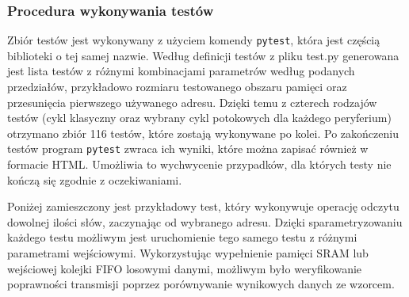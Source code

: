 \subsubsection{Procedura wykonywania testów}
Zbiór testów jest wykonywany z użyciem komendy \texttt{pytest}, która jest częścią biblioteki o tej samej nazwie. Według definicji testów z pliku test.py generowana jest lista testów z różnymi kombinacjami parametrów według podanych przedziałów, przykładowo rozmiaru testowanego obszaru pamięci oraz przesunięcia pierwszego używanego adresu. Dzięki temu z czterech rodzajów testów (cykl klasyczny oraz wybrany cykl potokowych dla każdego peryferium) otrzymano zbiór 116 testów, które zostają wykonywane po kolei. Po zakończeniu testów program \texttt{pytest} zwraca ich wyniki, które można zapisać również w formacie HTML. Umożliwia to wychwycenie przypadków, dla których testy nie kończą się zgodnie z oczekiwaniami.

Poniżej zamieszczony jest przykładowy test, który wykonywuje operację odczytu dowolnej ilości słów, zaczynając od wybranego adresu. Dzięki sparametryzowaniu każdego testu możliwym jest uruchomienie tego samego testu z różnymi parametrami wejściowymi. Wykorzystując wypełnienie pamięci SRAM lub wejściowej kolejki FIFO losowymi danymi, możliwym było weryfikowanie poprawności transmisji poprzez porównywanie wynikowych danych ze wzorcem.

